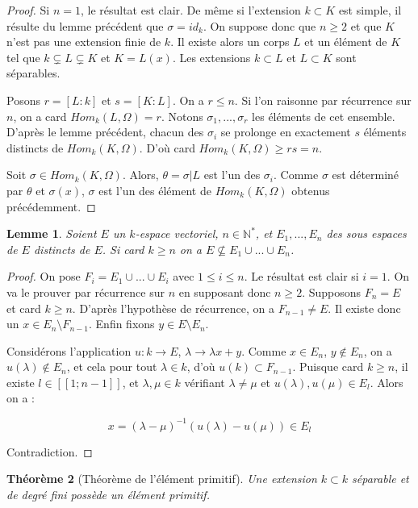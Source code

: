 \documentclass[12pt,a4paper]{report}
\newtheorem{thm}{\bf Th\'eor\`eme}
\newtheorem{lem}[thm]{\bf Lemme}
\begin{document}
\begin{proof}
Si $n=1$, le résultat est clair. De même si l'extension $k\subset K$ est simple, il résulte du lemme précédent que $\sigma=id_k$. On suppose donc que $n\geq 2$ et que $K$ n'est pas une extension finie de $k$. Il existe alors un corps $L$ et un élément de $K$ tel que $ k\varsubsetneq L \varsubsetneq K$ et $K=L(x).$ Les extensions $k \subset L$ et $L \subset K$ sont séparables. 

Posons $r=[L:k]$ et $s=[K:L]$. On a $r\leq n$. Si l'on raisonne par récurrence sur $n$, on a card $Hom_k(L,\Omega)=r$. Notons $\sigma_1,...,\sigma_r$ les éléments de cet ensemble. D'après le lemme précédent, chacun des $\sigma_i$ se prolonge en exactement $s$ éléments distincts de $Hom_k(K,\Omega)$. D'où card $Hom_k(K,\Omega)\geq rs=n$.

Soit $\sigma \in Hom_k(K,\Omega)$. Alors, $\theta = \sigma|L$ est l'un des $\sigma_i$. Comme $\sigma$ est déterminé par $\theta$ et $\sigma(x)$, $\sigma$ est l'un des élément de $Hom_k(K,\Omega)$ obtenus précédemment. 
\end{proof}

\begin{lem}\rm
Soient $E$ un $k$-espace vectoriel, $n \in \mathbb{N}^{*}$, et $E_1,...,E_n$ des sous espaces de $E$ distincts de $E$. Si card $k\geq n$ on a $E \nsubseteq E_1 \cup ... \cup E_n$.  
\end{lem}

\begin{proof}
On pose $F_i=E_1 \cup ... \cup E_i$ avec $1\leq i\leq n.$ Le résultat est clair si $i=1$. On va le prouver par récurrence sur $n$ en supposant donc $n\geq 2$. Supposons $F_n=E$ et card $k\geq n$. D'après l'hypothèse de récurrence, on a $F_{n-1} \neq E$. Il existe donc un $x \in E_n \setminus F_{n-1}$. Enfin fixons $y\in  E\setminus E_n$. 

Considérons l'application $u : k \rightarrow E$, $\lambda \rightarrow \lambda x +y$. Comme $x\in E_n$, $y \notin E_n$, on a $u(\lambda) \notin E_n$, et cela pour tout $\lambda \in k$, d'où $u(k) \subset F_{n-1}$. Puisque card $k\geq n$, il existe $l \in [\![1;n-1]\!] $, et $\lambda, \mu \in k$ vérifiant $\lambda \neq \mu$ et $u(\lambda),u(\mu) \in E_l$. Alors on a : 

$$x=(\lambda -\mu )^{-1}(u(\lambda)-u(\mu))\in E_l$$

Contradiction. 
\end{proof}



\begin{thm}[Théorème de l'élément primitif]\rm
Une extension $k \subset k$ séparable et de degré fini possède un élément primitif. 
\end{thm}
\end{document}
